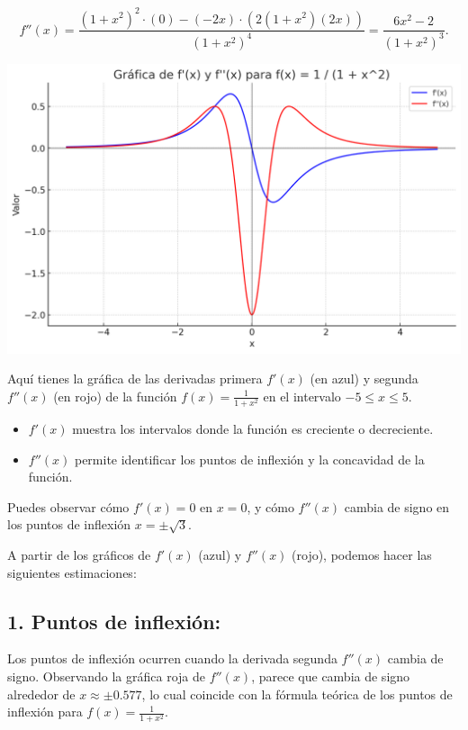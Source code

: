 \documentclass[11pt,letterpaper]{article}
\begin{document}
\[
f''(x) = \frac{(1+x^2)^2 \cdot (0) - (-2x) \cdot (2(1+x^2)(2x))}{(1+x^2)^4} = \frac{6x^2 - 2}{(1+x^2)^3}.
\]

\begin{center}
    \includegraphics[width=17cm]{./imagenes/grafica1.png}
\end{center}

Aquí tienes la gráfica de las derivadas primera \( f'(x) \) (en azul) y segunda \( f''(x) \) (en rojo) de la función \( f(x) = \frac{1}{1+x^2} \) en el intervalo \( -5 \leq x \leq 5 \).

\begin{itemize}
    \item \( f'(x) \) muestra los intervalos donde la función es creciente o decreciente.
    \item \( f''(x) \) permite identificar los puntos de inflexión y la concavidad de la función.
\end{itemize}

Puedes observar cómo \( f'(x) = 0 \) en \( x = 0 \), y cómo \( f''(x) \) cambia de signo en los puntos de inflexión \( x = \pm \sqrt{3} \).

A partir de los gráficos de \( f'(x) \) (azul) y \( f''(x) \) (rojo), podemos hacer las siguientes estimaciones:

\subsection*{1. Puntos de inflexión:}

Los puntos de inflexión ocurren cuando la derivada segunda \( f''(x) \) cambia de signo. Observando la gráfica roja de \( f''(x) \), parece que cambia de signo alrededor de \( x \approx \pm 0.577 \), lo cual coincide con la fórmula teórica de los puntos de inflexión para \( f(x) = \frac{1}{1 + x^2} \).
\end{document}
